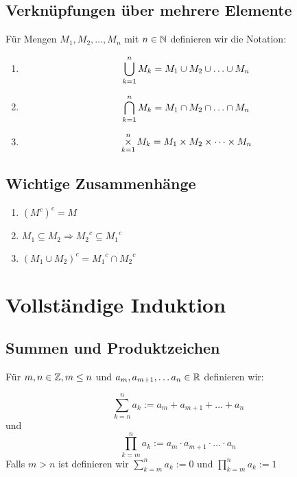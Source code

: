 \subsection{Verknüpfungen über mehrere Elemente}
Für Mengen $M_1, M_2, \ldots, M_n$ mit $n \in \mathbb{N}$ definieren wir die Notation:
\begin{enumerate}[label= (\alph*)]
    \item
        \begin{equation*}
            \mathop{\bigcup}\displaylimits_{k=1}^n M_k = M_1 \cup M_2 \cup \ldots \cup M_n
        \end{equation*}
    \item
        \begin{equation*}
            \mathop{\bigcap}\displaylimits_{k=1}^n M_k = M_1 \cap M_2 \cap \ldots \cap M_n
        \end{equation*}
    \item
        \begin{equation*}
            \mathop{\times}\displaylimits_{k=1}^n M_k = M_1 \times M_2 \times \cdots \times M_n
        \end{equation*}
\end{enumerate}

\subsection{Wichtige Zusammenhänge}
\begin{enumerate}[label= (\alph*)]
    \item ${(M^c)}^c = M$
    \item $M_1 \subseteq M_2 \Rightarrow {M_2}^c \subseteq {M_1}^c$
    \item ${(M_1 \cup M_2)}^c = {M_1}^c \cap {M_2}^c$
\end{enumerate}

\section{Vollständige Induktion}

\subsection{Summen und Produktzeichen}
Für $m, n \in \mathbb{Z}, m \leq n$ und $a_m, a_{m+1}, \ldots a_n \in \mathbb{R}$ definieren
wir:

\begin{equation*}
    \sum_{k=n}^n a_k := a_m + a_{m+1} + \ldots + a_n
\end{equation*}
und
\begin{equation*}
    \prod_{k=m}^n a_k := a_m \cdot a_{m+1} \cdot \ldots \cdot a_n
\end{equation*}
Falls $m>n$ ist definieren wir $\sum_{k=m}^n a_k := 0$ und
$\prod_{k=m}^n a_k := 1$

